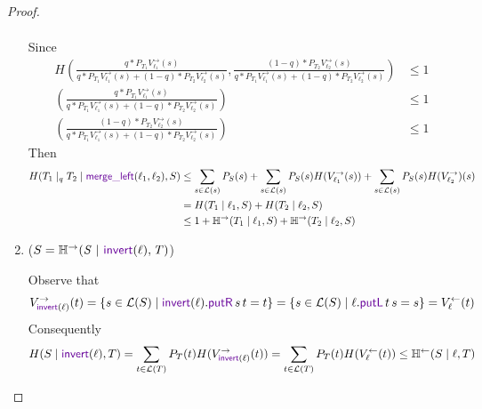 \documentclass[acmsmall,screen,anonymous]{acmart}
\begin{document}
\begin{proof}
\begin{enumerate}
\begin{align*}
\end{align*}
Since
\begin{align*}
H \left(\frac{q * P_{T_1}V^{\rightarrow}_{\ell_1}(s)}{q * P_{T_1}V^{\rightarrow}_{\ell_1}(s) + (1-q) * P_{T_2}V^{\rightarrow}_{\ell_2}(s)}, \frac{(1-q) * P_{T_2}V^{\rightarrow}_{\ell_2}(s)}{q * P_{T_1}V^{\rightarrow}_{\ell_1}(s) + (1-q) * P_{T_2}V^{\rightarrow}_{\ell_2}(s)}\right) &\leq 1\\
\left(\frac{q * P_{T_1}V^{\rightarrow}_{\ell_1}(s)}{q * P_{T_1}V^{\rightarrow}_{\ell_1}(s) + (1-q) * P_{T_2}V^{\rightarrow}_{\ell_2}(s)}\right) &\leq 1\\
\left(\frac{(1-q) * P_{T_2}V^{\rightarrow}_{\ell_2}(s)}{q * P_{T_1}V^{\rightarrow}_{\ell_1}(s) + (1-q) * P_{T_2}V^{\rightarrow}_{\ell_2}(s)}\right) &\leq 1
\end{align*}
Then
\begin{align*}
H(T_1 \; |_q \; T_2 \; | \; \MergeLOf{\Lens_1}{\Lens_2}, S) & \leq \sum_{s \in \mathcal{L}(s)}P_S(s) + \sum_{s \in \mathcal{L}(s)}P_S(s)H(V^{\rightarrow}_{\ell_1}(s)) + \sum_{s \in \mathcal{L}(s)}P_S(s)H(V^{\rightarrow}_{\ell_2})(s)\\
&= H(T_1 \; | \; \ell_1, S) + H(T_2 \; | \; \ell_2, S)\\
&\leq 1 + \mathbb{H}^{\rightarrow}(T_1 \; | \; \ell_1, S) + \mathbb{H}^{\rightarrow}(T_2 \; | \; \ell_2, S)
\end{align*}
\item
($S = \REntropyOf{\Regex \Given \InvertOf{\Lens}, \RegexAlt}$)

Observe that $$V^{\rightarrow}_{\InvertOf{\Lens}}(t) = \{s \in \mathcal{L}(S) \; | \; \InvertOf{\Lens}.\PutROf{s}{t} = t\} = \{s \in \mathcal{L}(S) \; | \; \ell.\PutLOf{t}{s} = s\} = V^{\leftarrow}_{\ell}(t)$$
Consequently
$$
H(S \; | \; \InvertOf{\Lens}, T) = \sum_{t \in \mathcal{L}(T)}P_T(t) H(V^{\rightarrow}_{\InvertOf{\Lens}}(t))
= \sum_{t \in \mathcal{L}(T)}P_T(t) H(V^{\leftarrow}_{\ell}(t))
\leq \mathbb{H}^{\leftarrow}(S\; | \; \ell, T)
$$
\end{enumerate}

\end{proof}
\end{document}

